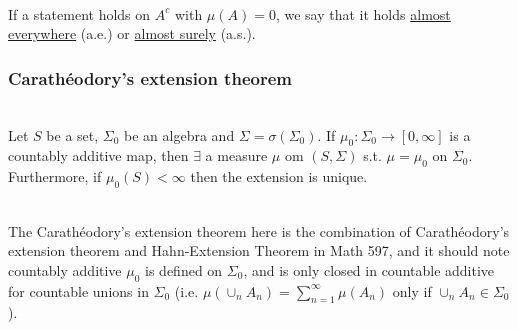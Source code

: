 \vspace{3pt}
\begin{definition}\ \\
If a statement holds on $A^c$ with $\mu(A) = 0$, we say that it holds \underline{almost everywhere} (a.e.) or \underline{almost surely} (a.s.).
\end{definition}

\vspace{6pt}
\subsubsection{Carath\'{e}odory's extension theorem}
\begin{theorem} \label{C-theorem}\ \\
Let $S$ be a set, $\Sigma_0$ be an algebra and $\Sigma = \sigma(\Sigma_0)$. If $\mu_0: \Sigma_0 \to [0,\infty]$ is a countably additive map, then $\exists$ a measure $\mu$ om $(S,\Sigma)$ s.t. $\mu = \mu_0$ on $\Sigma_0$. Furthermore, if $\mu_0(S) < \infty$ then the extension is unique.
\end{theorem}
\begin{remark}\ \\
The Carath\'{e}odory's extension theorem here is the combination of Carath\'{e}odory's extension theorem and Hahn-Extension Theorem in Math 597, and it should note countably additive $\mu_0$ is defined on $\Sigma_0$, and is only closed in countable additive for countable unions in $\Sigma_0$ (i.e. $\mu(\cup_{n} A_n) = \sum_{n=1}^\infty \mu(A_n)$ only if $\cup_{n} A_n \in \Sigma_0$).
\end{remark}


